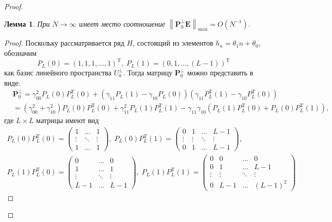 \documentclass[specialist,
               substylefile = spbu_report.rtx,
               subf,href,colorlinks=true, 12pt]{disser}
\newcommand\norm[1]{\left\|#1\right\|}
\newtheorem{lemma}{Лемма}
\begin{document}
\begin{proof}
\begin{lemma}
	При $N\rightarrow\infty$ имеет место соотношение $\norm{\mathbf{P}_0^{\bot}\mathbf{E}}_{\max} = O(N^{-1}).$
\end{lemma}
\begin{proof}
	Поскольку рассматривается ряд $H$, состоящий из элементов $h_n = \theta_1n + \theta_0$, обозначим
	\begin{equation*}
		P_L(0)=(1,1,1,\dots,1)^\mathrm{T},\; P_L(1)=(0,1,\dots,(L-1))^\mathrm{T}
	\end{equation*}
	как базис линейного пространства $U_0^\bot$. Тогда матрицу $\mathbf{P}_0^\bot$ можно представить в виде:
	\begin{align}
		&\mathbf{P}_0^\bot=\gamma_{00}^2P_L(0)P_L^\mathrm{T}(0)+(\gamma_{11}P_L(1)-\gamma_{10}P_L(0))(\gamma_{11}P_L^\mathrm{T}(1)-\gamma_{10}P_L^\mathrm{T}(0))\nonumber
		\\
		&=(\gamma_{00}^2+\gamma_{10}^2)P_L(0)P_L^\mathrm{T}(0)+\gamma_{11}^2P_L(1)P_L^\mathrm{T}(1)-\gamma_{11}\gamma_{10}(P_L(1)P_L^\mathrm{T}(0)+P_L(0)P_L^\mathrm{T}(1)),\label{eq:l_3}
	\end{align}
	где $L\times L$ матрицы имеют вид
	\begin{align*}
		P_L(0)P_L^\mathrm{T}(0)=
		\begin{pmatrix}
			1 & \dots & 1\\
			\vdots & \ddots & \vdots\\
			1 & \dots & 1
		\end{pmatrix}
		,\; P_L(0)P_L^\mathrm{T}(1)=
		\begin{pmatrix}
			0&1&\dots&L-1\\
			\vdots&\vdots&\ddots&\vdots\\
			0&1&\dots&L-1
		\end{pmatrix}
		,\\
		P_L(1)P_L^\mathrm{T}(0)=
		\begin{pmatrix}
			0&\dots&0\\
			1&\dots&1\\
			\vdots&\ddots&\vdots\\
			L-1&\dots&L-1
		\end{pmatrix}
		,\; P_L(1)P_L^\mathrm{T}(1)=
		\begin{pmatrix}
			0&0&\dots&0\\
			0&1&\dots&L-1\\
			\vdots&\vdots&\ddots&\vdots\\
			0&L-1&\dots&(L-1)^2
		\end{pmatrix}
	\end{align*}

\end{proof}
\end{proof}
\end{document}

